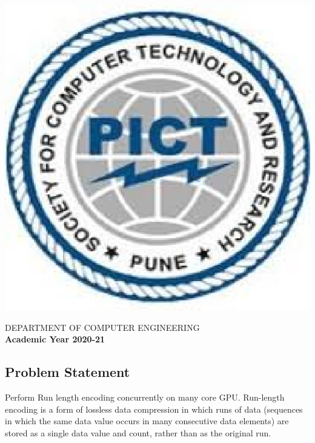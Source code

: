 \documentclass[a4paper, 12pt]{article}
\begin{document}
\begin{titlepage}
\begin{center}
        \includegraphics[scale=0.6]{pict.eps}   
        
        \Large
        DEPARTMENT OF COMPUTER ENGINEERING\\
        \textbf{Academic Year 2020-21}
        
    \end{center}
\end{titlepage}
\pagebreak

\newpage
\tableofcontents

\newpage
{}
\begin{center}
    \section{Problem Statement}
\end{center}

Perform Run length encoding concurrently on many core GPU. Run-length encoding is a form of lossless data compression in which runs of data (sequences in which the same data value occurs in many consecutive data elements) are stored as a single data value and count, rather than as the original run.
\end{document}
